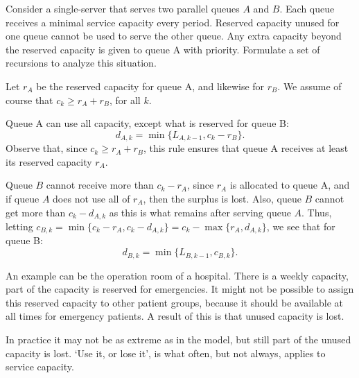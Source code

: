 \begin{exercise} 
 Consider a single-server that serves two parallel queues $A$ and $B$.
 Each queue receives a minimal service capacity every period.
 Reserved capacity unused for one queue cannot be used to serve the other queue.
 Any extra capacity beyond the reserved capacity is given to queue A with priority.
 Formulate a set of recursions to analyze this situation.

 Let $r_A$ be the reserved capacity for queue A, and likewise for
 $r_B$. We assume of course that $c_k\geq r_A + r_B$, for all $k$.
\begin{solution} Queue A can use all capacity, except what is
 reserved for queue B:
\begin{equation*}
 d_{A, k} = \min\{L_{A, k-1}, c_k - r_B\}.
\end{equation*}
Observe that, since $c_k \geq r_A + r_B$, this rule ensures that queue
A receives at least its reserved capacity $r_A$.

Queue $B$ cannot receive more than $c_k-r_A$, since $r_A$ is allocated
to queue A, and if queue $A$ does not use all of $r_A$, then the
surplus is lost. Also, queue $B$ cannot get more than $c_k - d_{A, k}$
as this is what remains after serving queue $A$. Thus, letting
$c_{B, k} = \min\{c_k-r_A, c_k-d_{A, k}\} = c_k - \max\{r_A, d_{A, k}\}$,
we see that for queue B:
\begin{equation*}
 d_{B, k} = \min\{L_{B, k-1}, c_{B, k}\}.
\end{equation*}

An example can be the operation room of a hospital.
There is a weekly capacity, part of the capacity is reserved for emergencies.
It might not be possible to assign this reserved capacity to other patient groups, because it should be available at all times for emergency patients.
A result of this is that unused capacity is lost.

In practice it may not be as extreme as in the model, but still part
of the unused capacity is lost. `Use it, or lose it', is what often,
but not always, applies to service capacity.
\end{solution}
\end{exercise}




